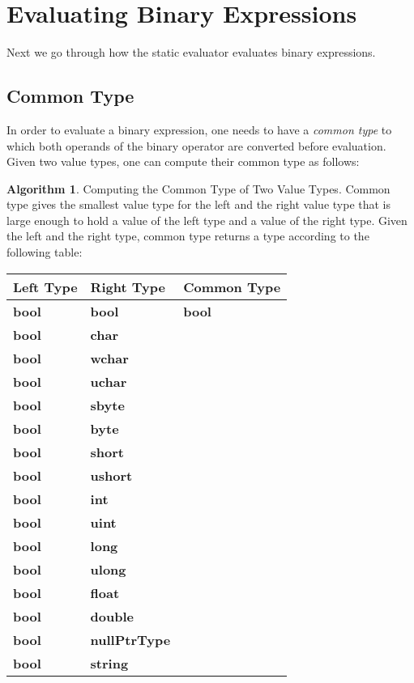 \documentclass[a4paper,oneside,11pt]{book}
\theoremstyle{definition}
\newtheorem{algo}{Algorithm}[section]
\begin{document}
\section{Evaluating Binary Expressions}

Next we go through how the static evaluator evaluates binary expressions.

\subsection{Common Type}

In order to evaluate a binary expression, one needs to have a \emph{common type} to which both operands of the binary operator are converted
before evaluation. Given two value types, one can compute their common type as follows:

\begin{algo}\label{commontype} Computing the Common Type of Two Value Types.
Common type gives the smallest value type for the left and the right value type
that is large enough to hold a value of the left type and a value of the right type.
Given the left and the right type, common type returns a type according to the following table:
\begin{flushleft}
\begin{supertabular}{lll}
\textbf{Left Type}& \textbf{Right Type}& \textbf{Common Type}\\
\hline
\textbf{bool}& \textbf{bool}& \textbf{bool}\\
\textbf{bool}& \textbf{char}& \\
\textbf{bool}& \textbf{wchar}& \\
\textbf{bool}& \textbf{uchar}& \\
\textbf{bool}& \textbf{sbyte}& \\
\textbf{bool}& \textbf{byte}& \\
\textbf{bool}& \textbf{short}& \\
\textbf{bool}& \textbf{ushort}& \\
\textbf{bool}& \textbf{int}& \\
\textbf{bool}& \textbf{uint}& \\
\textbf{bool}& \textbf{long}& \\
\textbf{bool}& \textbf{ulong}& \\
\textbf{bool}& \textbf{float}& \\
\textbf{bool}& \textbf{double}& \\
\textbf{bool}& \textbf{nullPtrType}& \\
\textbf{bool}& \textbf{string}& \\

\end{supertabular}
\end{flushleft}
\end{algo}
\end{document}
